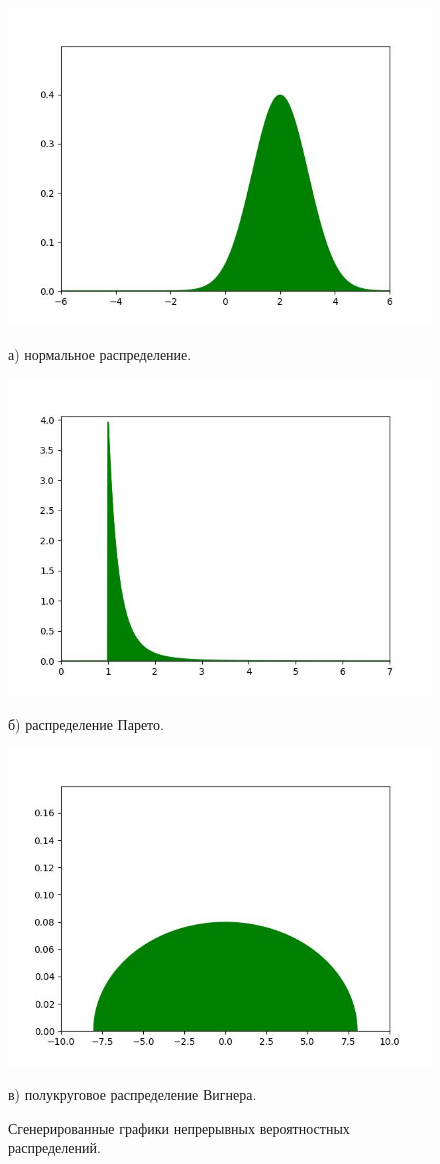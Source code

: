 \documentclass[14pt, russian]{scrartcl}
\begin{document}
\begin{figure}[H]
	\centering
	\begin{minipage}[t]{.4\textwidth}
		\centering
		\includegraphics[width=0.75\linewidth]{./img/norm_3.jpg}
		\caption*{а) нормальное распределение.}
	\end{minipage}
	\noindent
	\begin{minipage}[t]{.4\textwidth}
		\centering
		\includegraphics[width=0.75\linewidth]{./img/pareto_3.jpg}
		\caption*{б) распределение Парето.}
	\end{minipage}
	\begin{minipage}[t]{.4\textwidth}
		\centering
		\includegraphics[width=0.75\linewidth]{./img/vigner_3.jpg}
		\caption*{в) полукруговое распределение Вигнера.}
	\end{minipage}
	\caption{Сгенерированные графики непрерывных вероятностных распределений.}
	\label{fig:gen2}
\end{figure}
\end{document}
